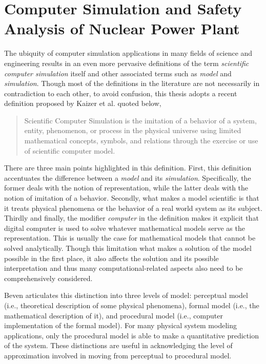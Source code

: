 \section{Computer Simulation and Safety Analysis of Nuclear Power Plant}\label{sec:intro_computer_simulation}

The ubiquity of computer simulation applications in many fields of science and engineering results in an even more pervasive definitions of the term \textit{scientific computer simulation} itself 
and other associated terms such as \textit{model} and \textit{simulation}.
Though most of the definitions in the literature are not necessarily in contradiction to each other, 
to avoid confusion, this thesis adopts a recent definition proposed by Kaizer et al.\cite{Kaizer2015} quoted below,

\begin{quote}
	Scientific Computer Simulation is the imitation of a behavior of a system, entity, phenomenon, or process in the physical universe 
	using limited mathematical concepts, symbols, and relations through the exercise or use of scientific computer model.
\end{quote}

There are three main points highlighted in this definition.
First, this definition accentuates the difference between a \emph{model} and its \emph{simulation}.
Specifically, the former deals with the notion of representation, while the latter deals with the notion of imitation of a behavior.
Secondly, what makes a model scientific is that it treats physical phenomena or the behavior of a real world system as its subject.
Thirdly and finally, the modifier \emph{computer} in the definition makes it explicit that digital computer is used to solve whatever mathematical models serve as the representation.
This is usually the case for mathematical models that cannot be solved analytically.
Though this limitation what makes a solution of the model possible in the first place, 
it also affects the solution and its possible interpretation and thus many computational-related aspects also need to be comprehensively considered.

Beven \cite{Beven2009} articulates this distinction into three levels of model: perceptual model (i.e., theoretical description of some physical phenomena), formal model (i.e., the mathematical description of it), and procedural model  (i.e., computer implementation of the formal model). For many physical system modeling applications, only the procedural model is able to make a quantitative prediction of the system. These distinctions are useful in acknowledging the level of approximation involved in moving from perceptual to procedural model.

